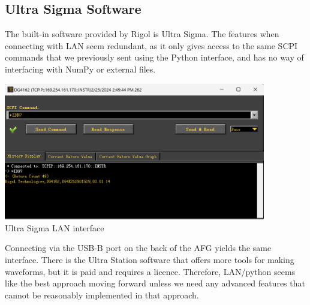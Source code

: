 \documentclass{article}
\begin{document}
    \subsection*{Ultra Sigma Software}
    The built-in software provided by Rigol is Ultra Sigma. The features when connecting with LAN seem redundant, as it only gives access to the same SCPI commands that we previously sent using the Python interface, and has no way of interfacing with NumPy or external files.
    \begin{mdframed}[backgroundcolor=gray!20, align = center, userdefinedwidth = 4.8in]
    \includegraphics[width = 4.5in]{img/ultraSigmaInterfaceLAN.png}
    \\Ultra Sigma LAN interface
    \end{mdframed}
    Connecting via the USB-B port on the back of the AFG yields the same interface. There is the Ultra Station software that offers more tools for making waveforms, but it is paid and requires a licence. Therefore, LAN/python seems like the best approach moving forward unless we need any advanced features that cannot be reasonably implemented in that approach.
\end{document}
